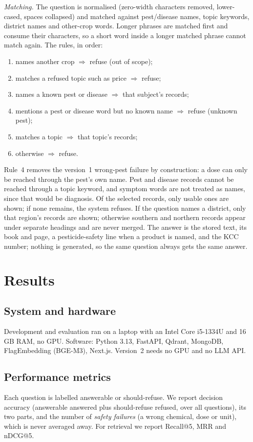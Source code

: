 \documentclass[conference]{IEEEtran}
\begin{document}
\textit{Matching.} The question is normalised (zero-width characters removed, lower-cased,
spaces collapsed) and matched against pest/disease names, topic keywords, district names and
other-crop words. Longer phrases are matched first and consume their characters, so a short
word inside a longer matched phrase cannot match again. The rules, in order:
\begin{enumerate}
\item names another crop $\Rightarrow$ refuse (out of scope);
\item matches a refused topic such as price $\Rightarrow$ refuse;
\item names a known pest or disease $\Rightarrow$ that subject's records;
\item mentions a pest or disease word but no known name $\Rightarrow$ refuse (unknown pest);
\item matches a topic $\Rightarrow$ that topic's records;
\item otherwise $\Rightarrow$ refuse.
\end{enumerate}
Rule~4 removes the version~1 wrong-pest failure by construction: a dose can only be reached
through the pest's own name. Pest and disease records cannot be reached through a topic
keyword, and symptom words are not treated as names, since that would be diagnosis. Of the
selected records, only usable ones are shown; if none remains, the system refuses. If the
question names a district, only that region's records are shown; otherwise southern and
northern records appear under separate headings and are never merged. The answer is the
stored text, its book and page, a pesticide-safety line when a product is named, and the KCC
number; nothing is generated, so the same question always gets the same answer.

\section{Results}
\label{sec:results}

\subsection{System and hardware}
Development and evaluation ran on a laptop with an Intel Core i5-1334U and 16\,GB RAM, no
GPU. Software: Python 3.13, FastAPI, Qdrant, MongoDB, FlagEmbedding (BGE-M3), Next.js.
Version~2 needs no GPU and no LLM API.

\subsection{Performance metrics}
Each question is labelled answerable or should-refuse. We report decision accuracy (answerable
answered plus should-refuse refused, over all questions), its two parts, and the number of
\emph{safety failures} (a wrong chemical, dose or unit), which is never averaged away. For
retrieval we report Recall@5, MRR and nDCG@5.
\end{document}
